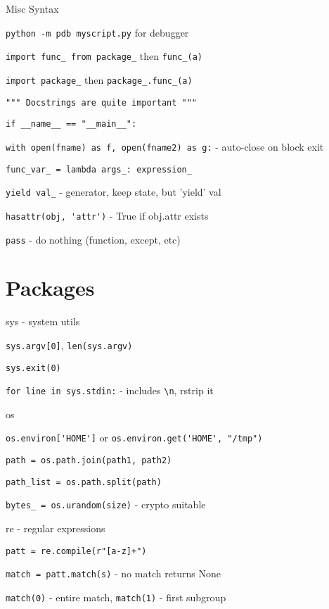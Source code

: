 \documentclass[10pt,a4paper]{article}
\begin{document}
\begin{multicols*}{3}
\noindent Misc Syntax
\begin{compactitem}
    \item \verb|python -m pdb myscript.py| for debugger
    \item \verb|import func_ from package_| then \verb|func_(a)|
    \item \verb|import package_| then \verb|package_.func_(a)|
    \item \verb|""" Docstrings are quite important """|
    \item \verb|if __name__ == "__main__":|
    \item \verb|with open(fname) as f, open(fname2) as g:| - auto-close on block exit
    \item \verb|func_var_ = lambda args_: expression_|
    \item \verb|yield val_| - generator, keep state, but 'yield' val
    \item \verb|hasattr(obj, 'attr')| - True if obj.attr exists
    \item \verb|pass| - do nothing (function, except, etc)
\end{compactitem}

\section{Packages}

\noindent sys - system utils
\begin{compactitem}
    \item \verb|sys.argv[0]|, \verb|len(sys.argv)|
    \item \verb|sys.exit(0)|
    \item \verb|for line in sys.stdin:| - includes \verb|\n|, rstrip it
\end{compactitem}

\noindent os
\begin{compactitem}
    \item \verb|os.environ['HOME']| or \verb|os.environ.get('HOME', "/tmp")|
    \item \verb|path = os.path.join(path1, path2)|
    \item \verb|path_list = os.path.split(path)|
    \item \verb|bytes_ = os.urandom(size)| - crypto suitable
\end{compactitem}

\noindent re - regular expressions
\begin{compactitem}
    \item \verb|patt = re.compile(r"[a-z]+")|
    \item \verb|match = patt.match(s)| - no match returns None
    \item \verb|match(0)| - entire match, \verb|match(1)| - first subgroup
\end{compactitem}


\end{multicols*}
\end{document}

